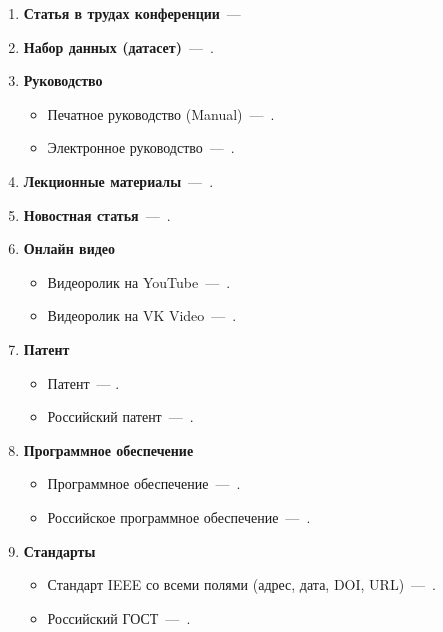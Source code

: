 \documentclass[eqsecnum,authorsinfo]{kioj6}
\begin{document}
\begin{enumerate}
        \item \textbf{Статья в трудах конференции}~---~\cite{BYSIS2022}

        \item \textbf{Набор данных (датасет)}~---~\cite{pavlov_2025_14923680}.

        \item \textbf{Руководство}
        \begin{itemize}[nosep]
            \item Печатное руководство (Manual)~---~\cite{TransmissionSystems}.
            \item Электронное руководство~---~\cite{BreimannRF}.
        \end{itemize}

        \item \textbf{Лекционные материалы}~---~\cite{BarneyLecture}.

        \item \textbf{Новостная статья}~---~\cite{MarkoffNews}.

        \item \textbf{Онлайн видео}
        \begin{itemize}[nosep]
            \item Видеоролик на YouTube~---~\cite{mtaOnlineVideo}.
            \item Видеоролик на VK Video~---~\cite{vkVideoExample}.
        \end{itemize}

        \item \textbf{Патент}
        \begin{itemize}[nosep]
            \item Патент~--- \cite{WilkinsonPatent}.
            \item Российский патент~---~\cite{sviridov}.
        \end{itemize}

        \item \textbf{Программное обеспечение}
        \begin{itemize}[nosep]
            \item Программное обеспечение~---~\cite{ArningSoftware}.
            \item Российское программное обеспечение~---~\cite{schoolPassportSoftware}.
        \end{itemize}

        \item \textbf{Стандарты}
        \begin{itemize}[nosep]
            \item Стандарт IEEE со всеми полями (адрес, дата, DOI, URL)~---~\cite{StdIEEE754Full}.
            \item Российский ГОСТ~---~\cite{gostMed57647}.
        \end{itemize}


\end{enumerate}
\end{document}

